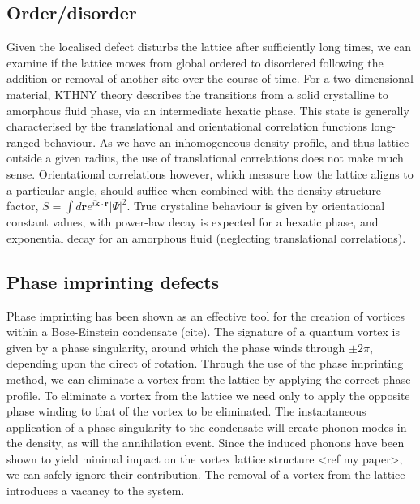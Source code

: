 \subsection{Order/disorder}
Given the localised defect disturbs the lattice after sufficiently long times, we can examine if the lattice moves from global ordered to
disordered following the addition or removal of another site over the course of time. For a two-dimensional material, KTHNY theory describes
the transitions from a solid crystalline to amorphous fluid phase, via an intermediate hexatic phase. This state is generally characterised
by the translational and orientational correlation functions long-ranged behaviour. As we have an inhomogeneous density profile, and thus
lattice outside a given radius, the use of translational correlations does not make much sense. Orientational correlations however, which
measure how the lattice aligns to a particular angle, should suffice when combined with the density structure factor,
$S = \int d\mathbf{r}e^{i\mathbf{k}\cdot\mathbf{r}}|\Psi|^2$. True crystaline behaviour is given by orientational constant values, with
power-law decay is expected for a hexatic phase, and exponential decay for an amorphous fluid (neglecting translational correlations).

\subsection{Phase imprinting defects}
Phase imprinting has been shown as an effective tool for the creation of vortices within a Bose-Einstein condensate (cite). The signature of
a quantum vortex is given by a phase singularity, around which the phase winds through $\pm 2\pi$, depending upon the direct of rotation.
Through the use of the phase imprinting method, we can eliminate a vortex from the lattice by applying the correct phase profile. To
eliminate a vortex from the lattice we need only to apply the opposite phase winding to that of the vortex to be eliminated. The
instantaneous application of a phase singularity to the condensate will create phonon modes in the density, as will the annihilation event.
Since the induced phonons have been shown to yield minimal impact on the vortex lattice structure <ref my paper>, we can safely
ignore their contribution. The removal of a vortex from the lattice introduces a vacancy to the system.


